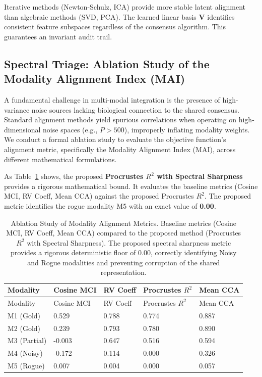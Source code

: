 \documentclass[
  letterpaper,
]{report}
\begin{document}
Iterative methods (Newton-Schulz, ICA) provide more stable latent
alignment than algebraic methods (SVD, PCA). The learned linear basis
\(\mathbf{V}\) identifies consistent feature subspaces regardless of the
consensus algorithm. This guarantees an invariant audit trail.

\subsection{Spectral Triage: Ablation Study of the Modality Alignment
Index
(MAI)}\label{spectral-triage-ablation-study-of-the-modality-alignment-index-mai}

A fundamental challenge in multi-modal integration is the presence of
high-variance noise sources lacking biological connection to the shared
consensus. Standard alignment methods yield spurious correlations when
operating on high-dimensional noise spaces (e.g., \(P > 500\)),
improperly inflating modality weights. We conduct a formal ablation
study to evaluate the objective function's alignment metric,
specifically the Modality Alignment Index (MAI), across different
mathematical formulations.

As Table~\ref{tbl-metric-tournament} shows, the proposed
\textbf{Procrustes \(R^2\) with Spectral Sharpness} provides a rigorous
mathematical bound. It evaluates the baseline metrics (Cosine MCI, RV
Coeff, Mean CCA) against the proposed Procrustes \(R^2\). The proposed
metric identifies the rogue modality M5 with an exact value of
\textbf{0.00}.

\begin{longtable}[]{@{}lllll@{}}
\caption{Ablation Study of Modality Alignment Metrics. Baseline metrics
(Cosine MCI, RV Coeff, Mean CCA) compared to the proposed method
(Procrustes \(R^2\) with Spectral Sharpness). The proposed spectral
sharpness metric provides a rigorous deterministic floor of 0.00,
correctly identifying Noisy and Rogue modalities and preventing
corruption of the shared
representation.}\label{tbl-metric-tournament}\tabularnewline
\toprule\noalign{}
Modality & Cosine MCI & RV Coeff & Procrustes \(R^2\) & Mean CCA \\
\midrule\noalign{}
\endfirsthead
\toprule\noalign{}
Modality & Cosine MCI & RV Coeff & Procrustes \(R^2\) & Mean CCA \\
\midrule\noalign{}
\endhead
\bottomrule\noalign{}
\endlastfoot
M1 (Gold) & 0.529 & 0.788 & 0.774 & 0.887 \\
M2 (Gold) & 0.239 & 0.793 & 0.780 & 0.890 \\
M3 (Partial) & -0.003 & 0.647 & 0.516 & 0.594 \\
M4 (Noisy) & -0.172 & 0.114 & 0.000 & 0.326 \\
M5 (Rogue) & 0.007 & 0.004 & 0.000 & 0.057 \\
\end{longtable}
\end{document}
